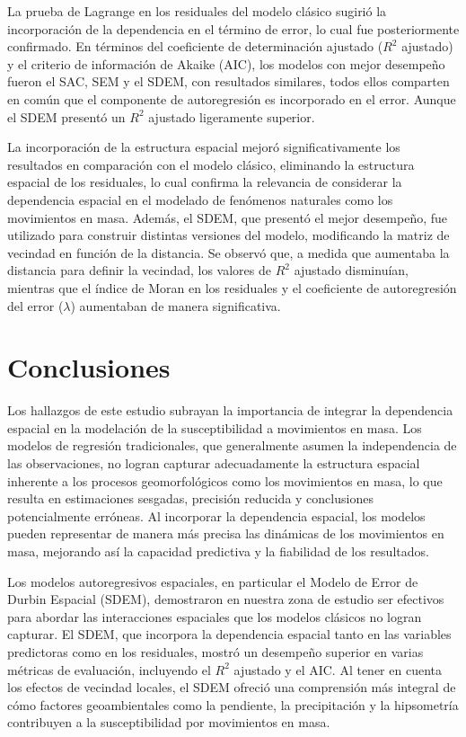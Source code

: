 \documentclass[
  manuscript=article,  
  layout=preprint,  
  year=2023,
  volume=0,
]{format}
\begin{document}
La prueba de Lagrange en los residuales del modelo clásico sugirió la incorporación de la dependencia en el término de error, lo cual fue posteriormente confirmado. En términos del coeficiente de determinación ajustado ($R^2$ ajustado) y el criterio de información de Akaike (AIC), los modelos con mejor desempeño fueron el SAC, SEM y el SDEM, con resultados similares, todos ellos comparten en común que el componente de autoregresión es incorporado en el error. Aunque el SDEM presentó un $R^2$ ajustado ligeramente superior.

La incorporación de la estructura espacial mejoró significativamente los resultados en comparación con el modelo clásico, eliminando la estructura espacial de los residuales, lo cual confirma la relevancia de considerar la dependencia espacial en el modelado de fenómenos naturales como los movimientos en masa. Además, el SDEM, que presentó el mejor desempeño, fue utilizado para construir distintas versiones del modelo, modificando la matriz de vecindad en función de la distancia. Se observó que, a medida que aumentaba la distancia para definir la vecindad, los valores de $R^2$ ajustado disminuían, mientras que el índice de Moran en los residuales y el coeficiente de autoregresión del error ($\lambda$) aumentaban de manera significativa.

\section{Conclusiones}

Los hallazgos de este estudio subrayan la importancia de integrar la dependencia espacial en la modelación de la susceptibilidad a movimientos en masa. Los modelos de regresión tradicionales, que generalmente asumen la independencia de las observaciones, no logran capturar adecuadamente la estructura espacial inherente a los procesos geomorfológicos como los movimientos en masa, lo que resulta en estimaciones sesgadas, precisión reducida y conclusiones potencialmente erróneas. Al incorporar la dependencia espacial, los modelos pueden representar de manera más precisa las dinámicas de los movimientos en masa, mejorando así la capacidad predictiva y la fiabilidad de los resultados.

Los modelos autoregresivos espaciales, en particular el Modelo de Error de Durbin Espacial (SDEM), demostraron en nuestra zona de estudio ser efectivos para abordar las interacciones espaciales que los modelos clásicos no logran capturar. El SDEM, que incorpora la dependencia espacial tanto en las variables predictoras como en los residuales, mostró un desempeño superior en varias métricas de evaluación, incluyendo el $R^2$ ajustado y el AIC. Al tener en cuenta los efectos de vecindad locales, el SDEM ofreció una comprensión más integral de cómo factores geoambientales como la pendiente, la precipitación y la hipsometría contribuyen a la susceptibilidad por movimientos en masa.
\end{document}
